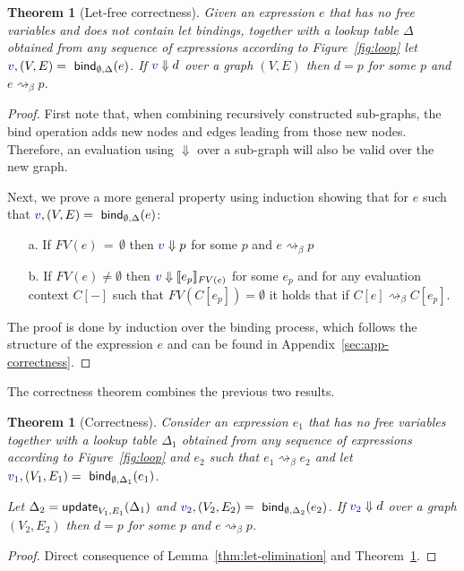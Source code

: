 \documentclass[sigplan,10pt]{acmart}\settopmatter{printfolios=true,printccs=false,printacmref=false}
\newcounter{thc}
\theoremstyle{plain}
\newtheorem{theorem}[thc]{Theorem}
\theoremstyle{definition}
\newcommand{\ident}[1]{\textnormal{\sffamily #1}}
\newcommand{\bndclr}[1]{\textcolor{kvdclr}{#1}}
\begin{document}
\begin{theorem}[Let-free correctness]
\label{thm:let-free-correct}
Given an expression $e$ that has no free variables and does not contain let bindings, together
with a lookup table $\Delta$ obtained from any sequence of expressions according to Figure~\ref{fig:loop}
let $\bndclr{v}, (V, E) = \ident{bind}_{\emptyset, \Delta}(e)$. If $\bndclr{v}\Downarrow d$ 
over a graph $(V, E)$ then $d = p$ for some $p$ and $e \rightsquigarrow_\beta p$.
\end{theorem}
\begin{proof}
First note that, when combining recursively constructed sub-graphs, the \ident{bind} operation
adds new nodes and edges leading from those new nodes. Therefore, an evaluation using $\Downarrow$
over a sub-graph will also be valid over the new graph.

Next, we prove a more general property using induction showing that for $e$ such 
that $\bndclr{v}, (V, E) = \ident{bind}_{\emptyset, \Delta}(e)$:
\begin{enumerate}
\item[a.] If $FV(e)\,=\,\emptyset$ then $\bndclr{v} \Downarrow p$ for some $p$ and $e \rightsquigarrow_\beta p$
\item[b.] If $FV(e)\neq\emptyset$ then $\bndclr{v} \Downarrow \llbracket e_p \rrbracket_{FV(e)}$ for some $e_p$ and
  for any evaluation context $C[-]$ such that $FV(C[e_p])=\emptyset$ it holds that if
  $C[e] \rightsquigarrow_\beta C[e_p]$.  
\end{enumerate}
%
The proof is done by induction over the binding process, which follows the structure 
of the expression $e$ and can be found in Appendix~\ref{sec:app-correctness}.
\end{proof}

\noindent
The correctness theorem combines the previous two results.

\begin{theorem}[Correctness]
\label{thm:correcntess}
Consider an expression $e_1$ that has no free variables together with a lookup table $\Delta_1$ obtained 
from any sequence of expressions according to Figure~\ref{fig:loop} and $e_2$ such that
$e_1\rightsquigarrow_\beta e_2$ and let $\bndclr{v_1}, (V_1, E_1) = \ident{bind}_{\emptyset, \Delta_1}(e_1)$.

Let $\Delta_2 = \ident{update}_{V_1, E_1}(\Delta_1)$ and $\bndclr{v_2}, (V_2, E_2) = \ident{bind}_{\emptyset, \Delta_2}(e_2)$.
If $\bndclr{v_2}\Downarrow d$ over a graph $(V_2, E_2)$ then $d = p$ for some $p$ and $e \rightsquigarrow_\beta p$.
\end{theorem}
\begin{proof}
Direct consequence of Lemma~\ref{thm:let-elimination} and Theorem~\ref{thm:let-free-correct}.
\end{proof}
\end{document}
